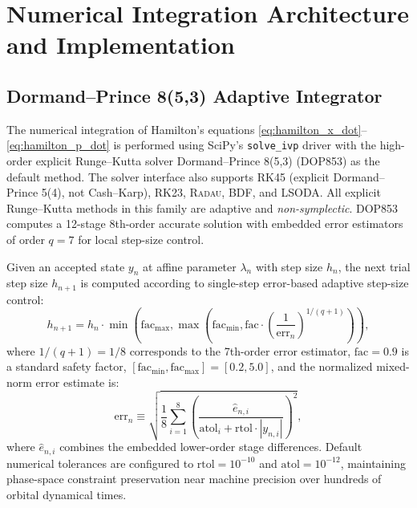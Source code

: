 \section{Numerical Integration Architecture and Implementation}
\label{sec:numerical_architecture}

\subsection{Dormand--Prince 8(5,3) Adaptive Integrator}
The numerical integration of Hamilton's equations \eqref{eq:hamilton_x_dot}--\eqref{eq:hamilton_p_dot} is performed using SciPy's \texttt{solve\_ivp} driver with the high-order explicit Runge--Kutta solver Dormand--Prince 8(5,3) (\textsc{DOP853}) \cite{DormandPrince1980,Hairer1993} as the default method. The solver interface also supports \textsc{RK45} (explicit Dormand--Prince 5(4), not Cash--Karp), \textsc{RK23}, \textsc{Radau}, \textsc{BDF}, and \textsc{LSODA}. All explicit Runge--Kutta methods in this family are adaptive and \textit{non-symplectic}. \textsc{DOP853} computes a 12-stage 8th-order accurate solution with embedded error estimators of order $q = 7$ for local step-size control.

Given an accepted state $y_n$ at affine parameter $\lambda_n$ with step size $h_n$, the next trial step size $h_{n+1}$ is computed according to single-step error-based adaptive step-size control:
\begin{equation}
    h_{n+1} = h_n \cdot \min\left( \text{fac}_{\max}, \max\left( \text{fac}_{\min}, \text{fac} \cdot \left(\frac{1}{\text{err}_n}\right)^{1/(q+1)} \right) \right),
    \label{eq:step_size_adaptation}
\end{equation}
where $1/(q+1) = 1/8$ corresponds to the 7th-order error estimator, $\text{fac} = 0.9$ is a standard safety factor, $[\text{fac}_{\min}, \text{fac}_{\max}] = [0.2, 5.0]$, and the normalized mixed-norm error estimate is:
\begin{equation}
    \text{err}_n \equiv \sqrt{ \frac{1}{8} \sum_{i=1}^8 \left( \frac{\hat{e}_{n, i}}{\text{atol}_i + \text{rtol} \cdot |y_{n, i}|} \right)^2 },
    \label{eq:error_norm}
\end{equation}
where $\hat{e}_{n, i}$ combines the embedded lower-order stage differences. Default numerical tolerances are configured to $\text{rtol} = 10^{-10}$ and $\text{atol} = 10^{-12}$, maintaining phase-space constraint preservation near machine precision over hundreds of orbital dynamical times.

